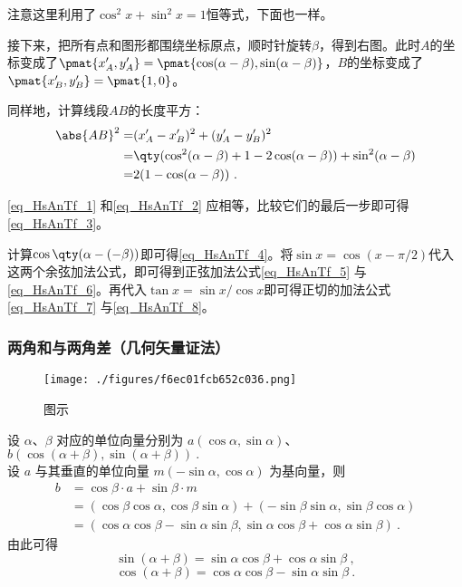 注意这里利用了$\cos^2x+\sin^2x=1$恒等式，下面也一样。

接下来，把所有点和图形都围绕坐标原点，顺时针旋转$\beta$，得到右图。此时$A$的坐标变成了$\pmat{x'_A, y'_A}=\pmat{\cos(\alpha-\beta), \sin(\alpha-\beta)}$，$B$的坐标变成了$\pmat{x'_B, y'_B}=\pmat{1, 0}$。

同样地，计算线段$AB$的长度平方：
\begin{equation}\label{eq_HsAnTf_2}
\begin{aligned}
\abs{AB}^2 =& (x'_A-x'_B)^2+(y'_A-y'_B)^2\\
=& \qty(\cos^2(\alpha-\beta)+1-2\cos(\alpha-\beta))+\sin^2(\alpha-\beta)\\
=& 2(1-\cos(\alpha-\beta))~.
\end{aligned}
\end{equation}

\autoref{eq_HsAnTf_1} 和\autoref{eq_HsAnTf_2} 应相等，比较它们的最后一步即可得\autoref{eq_HsAnTf_3}。

计算$\cos\qty(\alpha-(-\beta))$即可得\autoref{eq_HsAnTf_4}。将$\sin x=\cos(x-\pi/2)$代入这两个余弦加法公式，即可得到正弦加法公式\autoref{eq_HsAnTf_5} 与\autoref{eq_HsAnTf_6}。再代入$\tan x=\sin x/\cos x$即可得正切的加法公式\autoref{eq_HsAnTf_7} 与\autoref{eq_HsAnTf_8}。



\subsubsection{两角和与两角差（几何矢量证法）}
\begin{figure}[ht]
\centering
\texttt{[image: ./figures/f6ec01fcb652c036.png]}
\caption{图示} \label{fig_HsAnTf_1}
\end{figure}
设 $\alpha$、$\beta$ 对应的单位向量分别为 $a(\cos\alpha,\sin\alpha)$、$b(\cos(\alpha+\beta),\sin(\alpha+\beta))~.$\\
设 $a$ 与其垂直的单位向量 $m(-\sin\alpha,\cos\alpha)$ 为基向量，则
\begin{equation}
\begin{aligned}
b &= \cos\beta \cdot a + \sin\beta \cdot m \\
&= (\cos\beta \cos\alpha,\cos\beta \sin\alpha) + (-\sin\beta \sin\alpha,\sin\beta \cos\alpha) \\
&= (\cos\alpha \cos\beta-\sin\alpha \sin\beta,\sin\alpha \cos\beta + \cos\alpha \sin\beta)~.
\end{aligned}
\end{equation}
由此可得
\begin{equation}
\sin(\alpha+\beta) = \sin\alpha \cos\beta + \cos\alpha \sin\beta~,
\end{equation}
\begin{equation}
\cos(\alpha+\beta) = \cos\alpha \cos\beta - \sin\alpha \sin\beta~.
\end{equation}

